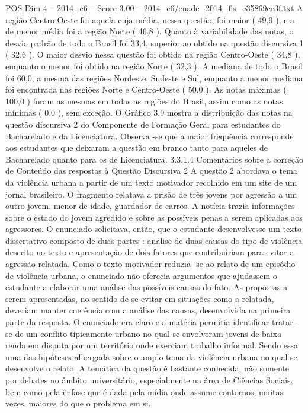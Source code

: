 \begin{textsample}{POS Dim 4 – 2014\_c6 – Score 3.00 – 2014\_c6/enade\_2014\_fis\_e35869ce3f.txt}
A região Centro-Oeste foi aquela cuja média, nessa questão, foi maior ( 49,9 ), e a de menor média foi a região Norte ( 46,8 ).
Quanto à variabilidade das notas, o desvio padrão de todo o Brasil foi 33,4, superior ao obtido na questão discursiva 1 ( 32,6 ).
O maior desvio nessa questão foi obtido na região Centro-Oeste ( 34,8 ), enquanto o menor foi obtido na região Norte ( 32,3 ).
A mediana de todo o Brasil foi 60,0, a mesma das regiões Nordeste, Sudeste e Sul, enquanto a menor mediana foi encontrada nas regiões Norte e Centro-Oeste ( 50,0 ).
As notas máximas ( 100,0 ) foram as mesmas em todas as regiões do Brasil, assim como as notas mínimas ( 0,0 ), sem exceção.
O Gráfico 3.9 mostra a distribuição das notas na questão discursiva 2 do Componente de Formação Geral para estudantes do Bacharelado e da Licenciatura.
Observa -se que a maior frequência corresponde aos estudantes que deixaram a questão em branco tanto para aqueles de Bacharelado quanto para os de Licenciatura. 3.3.1.4 Comentários sobre a correção de Conteúdo das respostas à Questão Discursiva 2 A questão 2 abordava o tema da violência urbana a partir de um texto motivador recolhido em um site de um jornal brasileiro.
O fragmento relatava a prisão de três jovens por agressão a um outro jovem, menor de idade, guardador de carros.
A notícia trazia informações sobre o estado do jovem agredido e sobre as possíveis penas a serem aplicadas aos agressores.
O enunciado solicitava, então, que o estudante desenvolvesse um texto dissertativo composto de duas partes : análise de duas causas do tipo de violência descrito no texto e apresentação de dois fatores que contribuiriam para evitar a agressão relatada.
Como o texto motivador reduzia -se ao relato de um episódio de violência urbana, o enunciado não oferecia argumentos que ajudassem o estudante a elaborar uma análise das possíveis causas do fato.
As propostas a serem apresentadas, no sentido de se evitar em situações como a relatada, deveriam manter coerência com a análise das causas, desenvolvida na primeira parte da resposta.
O enunciado era claro e a matéria permitia identificar tratar -se de um conflito tipicamente urbano no qual se envolveram jovens de baixa renda em disputa por um território onde exerciam trabalho informal.
Sendo essa uma das hipóteses albergada sobre o amplo tema da violência urbana no qual se desenvolve o relato.
A temática da questão é bastante conhecida, não somente por debates no âmbito universitário, especialmente na área de Ciências Sociais, bem como pela ênfase que é dada pela mídia onde assume contornos, muitas vezes, maiores do que o problema em si.

\end{textsample}
